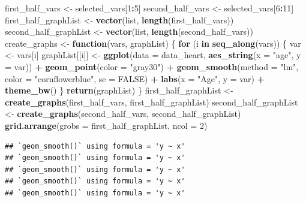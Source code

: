 \documentclass[
]{article}
\newenvironment{Shaded}{\begin{snugshade}}{\end{snugshade}}
\newcommand{\AttributeTok}[1]{\textcolor[rgb]{0.13,0.29,0.53}{#1}}
\newcommand{\ConstantTok}[1]{\textcolor[rgb]{0.56,0.35,0.01}{#1}}
\newcommand{\ControlFlowTok}[1]{\textcolor[rgb]{0.13,0.29,0.53}{\textbf{#1}}}
\newcommand{\DecValTok}[1]{\textcolor[rgb]{0.00,0.00,0.81}{#1}}
\newcommand{\FunctionTok}[1]{\textcolor[rgb]{0.13,0.29,0.53}{\textbf{#1}}}
\newcommand{\NormalTok}[1]{#1}
\newcommand{\OtherTok}[1]{\textcolor[rgb]{0.56,0.35,0.01}{#1}}
\newcommand{\SpecialCharTok}[1]{\textcolor[rgb]{0.81,0.36,0.00}{\textbf{#1}}}
\newcommand{\StringTok}[1]{\textcolor[rgb]{0.31,0.60,0.02}{#1}}
\begin{document}
\begin{Shaded}
\begin{Highlighting}[]
\NormalTok{first\_half\_vars }\OtherTok{\textless{}{-}}\NormalTok{ selected\_vars[}\DecValTok{1}\SpecialCharTok{:}\DecValTok{5}\NormalTok{]}
\NormalTok{second\_half\_vars }\OtherTok{\textless{}{-}}\NormalTok{ selected\_vars[}\DecValTok{6}\SpecialCharTok{:}\DecValTok{11}\NormalTok{]}
\NormalTok{first\_half\_graphList }\OtherTok{\textless{}{-}} \FunctionTok{vector}\NormalTok{(}\StringTok{\textquotesingle{}list\textquotesingle{}}\NormalTok{, }\FunctionTok{length}\NormalTok{(first\_half\_vars))}
\NormalTok{second\_half\_graphList }\OtherTok{\textless{}{-}} \FunctionTok{vector}\NormalTok{(}\StringTok{\textquotesingle{}list\textquotesingle{}}\NormalTok{, }\FunctionTok{length}\NormalTok{(second\_half\_vars))}
\NormalTok{create\_graphs }\OtherTok{\textless{}{-}} \ControlFlowTok{function}\NormalTok{(vars, graphList) \{}
  \ControlFlowTok{for}\NormalTok{ (i }\ControlFlowTok{in} \FunctionTok{seq\_along}\NormalTok{(vars)) \{}
\NormalTok{    var }\OtherTok{\textless{}{-}}\NormalTok{ vars[i]}
\NormalTok{    graphList[[i]] }\OtherTok{\textless{}{-}} \FunctionTok{ggplot}\NormalTok{(}\AttributeTok{data =}\NormalTok{ data\_heart, }\FunctionTok{aes\_string}\NormalTok{(}\AttributeTok{x =} \StringTok{"age"}\NormalTok{, }\AttributeTok{y =}\NormalTok{ var)) }\SpecialCharTok{+}
      \FunctionTok{geom\_point}\NormalTok{(}\AttributeTok{color =} \StringTok{"gray30"}\NormalTok{) }\SpecialCharTok{+} \FunctionTok{geom\_smooth}\NormalTok{(}\AttributeTok{method =} \StringTok{"lm"}\NormalTok{, }\AttributeTok{color =} \StringTok{"cornflowerblue"}\NormalTok{, }\AttributeTok{se =} \ConstantTok{FALSE}\NormalTok{) }\SpecialCharTok{+}
      \FunctionTok{labs}\NormalTok{(}\AttributeTok{x =} \StringTok{"Age"}\NormalTok{, }\AttributeTok{y =}\NormalTok{ var) }\SpecialCharTok{+} \FunctionTok{theme\_bw}\NormalTok{()}
\NormalTok{  \}}
  \FunctionTok{return}\NormalTok{(graphList)}
\NormalTok{\}}
\NormalTok{first\_half\_graphList }\OtherTok{\textless{}{-}} \FunctionTok{create\_graphs}\NormalTok{(first\_half\_vars, first\_half\_graphList)}
\NormalTok{second\_half\_graphList }\OtherTok{\textless{}{-}} \FunctionTok{create\_graphs}\NormalTok{(second\_half\_vars, second\_half\_graphList)}
\FunctionTok{grid.arrange}\NormalTok{(}\AttributeTok{grobs =}\NormalTok{ first\_half\_graphList, }\AttributeTok{ncol =} \DecValTok{2}\NormalTok{)}
\end{Highlighting}
\end{Shaded}

\begin{verbatim}
## `geom_smooth()` using formula = 'y ~ x'
## `geom_smooth()` using formula = 'y ~ x'
## `geom_smooth()` using formula = 'y ~ x'
## `geom_smooth()` using formula = 'y ~ x'
## `geom_smooth()` using formula = 'y ~ x'
\end{verbatim}
\end{document}
